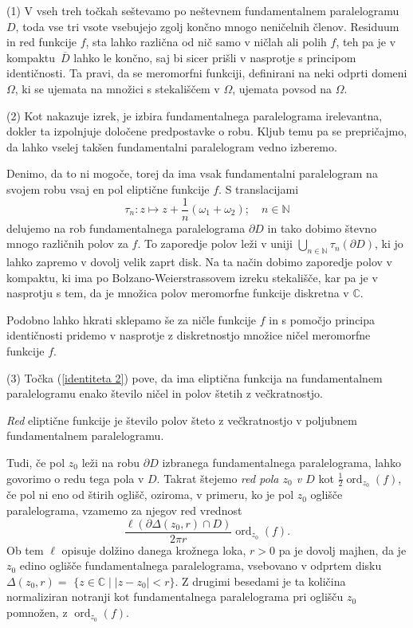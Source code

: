 \documentclass[mat1]{fmfdelo}
\numberwithin{equation}{section}
\newcommand{\N}{\mathbb N}
\newcommand{\C}{\mathbb C}
\newcommand{\om}{\omega}
\newcommand{\ord}[2]{\operatorname{ord}_{#1}(#2)}
\newcommand{\olsi}[1]{\,\overline{\!{#1}}} %
\theoremstyle{definition}
\begin{document}
\begin{opomba}
    \label{liouville opomba}

    (1) V vseh treh točkah seštevamo po neštevnem fundamentalnem paralelogramu $D$, toda vse tri vsote vsebujejo zgolj končno mnogo neničelnih členov. Residuum in red funkcije $f$, sta lahko različna od nič samo v ničlah ali polih $f$, teh pa je v kompaktu $\olsi{D}$ lahko le končno, saj bi sicer prišli v nasprotje s principom identičnosti. Ta pravi, da se meromorfni funkciji, definirani na neki odprti domeni $\Omega$, ki se ujemata na množici s stekališčem v $\Omega$, ujemata povsod na $\Omega$.
     
    (2) Kot nakazuje izrek, je izbira fundamentalnega paralelograma irelevantna, dokler ta izpolnjuje določene predpostavke o robu. Kljub temu pa se prepričajmo, da lahko vselej takšen fundamentalni paralelogram vedno izberemo. 

    Denimo, da to ni mogoče, torej da ima vsak fundamentalni paralelogram na svojem robu vsaj en pol eliptične funkcije $f$. S translacijami
    \[
        \tau_n : z \mapsto z + \frac{1}{n}(\om_1 + \om_2); \quad n\in \N
    \]
    delujemo na rob fundamentalnega paralelograma $\partial D$ in tako dobimo števno mnogo različnih polov za $f$. To zaporedje polov leži v uniji $\bigcup_{n \in \N} \tau_n(\partial D)$, ki jo lahko zapremo v dovolj velik zaprt disk. Na ta način dobimo zaporedje polov v kompaktu, ki ima po Bolzano-Weierstrassovem izreku stekališče, kar pa je v nasprotju s tem, da je množica polov meromorfne funkcije diskretna v $\C$. 
    
    Podobno lahko hkrati sklepamo še za ničle funkcije $f$ in s pomočjo principa identičnosti pridemo v nasprotje z diskretnostjo množice ničel meromorfne funkcije $f$.
    
    (3) Točka (\ref{identiteta 2}) pove, da ima eliptična funkcija na fundamentalnem paralelogramu enako število ničel in polov štetih z večkratnostjo. 

\end{opomba}

\begin{definicija}
    \emph{Red} eliptične funkcije je število polov šteto z večkratnostjo v poljubnem fundamentalnem paralelogramu. 
\end{definicija}

Tudi, če pol $z_0$ leži na robu $\partial D$ izbranega fundamentalnega paralelograma, lahko govorimo o redu tega pola v $D$. Takrat štejemo \emph{red pola $z_0$ v $D$} kot $\frac{1}{2}\ord{z_0}{f}$, če pol ni eno od štirih oglišč, oziroma, v primeru, ko je pol $z_0$ oglišče paralelograma, vzamemo za njegov red vrednost
\[
    \frac{\ell(\partial \Delta(z_0, r) \cap D)}{2 \pi r}\ord{z_0}{f}.
\]
Ob tem $\ell$ opisuje dolžino danega krožnega loka, $r > 0$ pa je dovolj majhen, da je $z_0$ edino oglišče fundamentalnega paralelograma, vsebovano v odprtem disku ${\Delta(z_0, r) =}$ ${\{z \in \C \mid \left\lvert z - z_0 \right\rvert < r\}}$. Z drugimi besedami je ta količina normaliziran notranji kot fundamentalnega paralelograma pri oglišču $z_0$ pomnožen, z $\ord{z_0}{f}$.  
\end{document}

